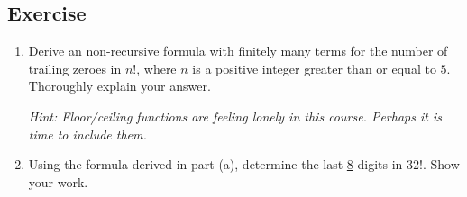 \documentclass{article}
\newcounter{counter}
\newcommand{\Exercise}{Exercise \stepcounter{counter}\thecounter}
\begin{document}
\subsection*{\Exercise}
    \begin{enumerate}
        \item Derive an non-recursive formula with finitely many terms for the number of trailing zeroes in $n!$, where $n$ is a positive integer greater than or equal to $5$. Thoroughly explain your answer. 
        
        \vspace{.5mm} {\small \textit{Hint: Floor/ceiling functions are feeling lonely in this course. Perhaps it is time to include them.}}
        \item Using the formula derived in part (a), determine the last \underline{8} digits in $32!$. Show your work.
    \end{enumerate}
\end{document}
